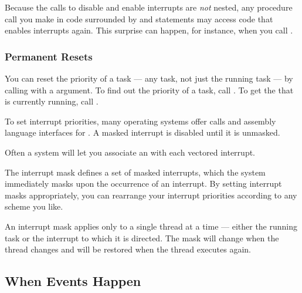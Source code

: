 Because the calls to disable and enable interrupts are {\em not\/} nested,
any procedure call you make in code surrounded by  and
 statements may access code that enables interrupts again.
This surprise can happen, for instance, when you call .

\subsubsection{Permanent Resets}

You can reset the priority of a task --- any task, not just the running
task --- by calling  with a  argument.
To find out the priority of a task, call .  To
get the  that is currently running, call
.

To set interrupt priorities, many operating systems offer calls and
assembly language interfaces for .  A masked
interrupt is disabled until it is unmasked.

Often a system will let you associate an  with each
vectored interrupt.

The interrupt mask defines a set of masked interrupts, which the system
immediately masks upon the occurrence of an interrupt.  By setting interrupt
masks appropriately, you can rearrange your interrupt priorities according
to any scheme you like.

An interrupt mask applies only to a single thread at a time --- either the
running task or the interrupt to which it is directed.  The mask will change
when the thread changes and will be restored when the thread executes again.

\subsection{When Events Happen}

